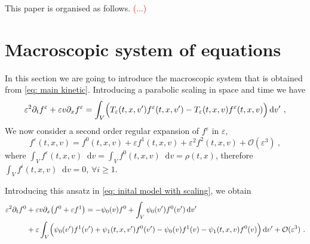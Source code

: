 \documentclass[11pt,twoside]{article}
\newcommand*\diff{\mathop{}\!\mathrm{d}}
\newcommand{\e}{\varepsilon}
\begin{document}
This paper is organised as follows. \textcolor{red}{(...)}


\section{Macroscopic system of equations}
In this section we are going to introduce the macroscopic system that is obtained from \eqref{eq: main kinetic}.
Introducing a parabolic scaling in space and time we have
\begin{equation}
    \varepsilon^2 \partial_t f^\varepsilon+\varepsilon{v}\partial_x f^\varepsilon = \int_V\Bigl(T_\varepsilon(t,x,v')f^\varepsilon(t,x,v')-T_\varepsilon(t,x,v)f^\varepsilon(t,x,v)\Bigr)\diff v'\ , \label{eq: inital model with scaling}
\end{equation}
We now consider a second order regular expansion of $f^\e$ in $\varepsilon$, 
\begin{equation*}
f^\e(t,{x},{v})=f^0(t,{x},{v})+\varepsilon f^1(t,{x},{v})+\varepsilon^2 f^2(t,{x},{v})+\mathcal{O}(\varepsilon^3)\ , 
\end{equation*}
where $\int_V f^\e(t,{x},{v})\diff {v} = \int_V f^0(t,{x},{v})\diff {v} = \rho(t,{x})$, therefore $\int_V f^i(t,{x},{v})\diff {v}=0$, $\forall i\geq 1$.






Introducing this ansatz in \eqref{eq: inital model with scaling}, we obtain
\iffalse
{\begin{align*}
    \varepsilon^2\partial_t f^0&+\varepsilon{v}\partial_x\big(f^0+\varepsilon f^1  \big) 
    =-\psi_0(v) f^0+\int_V\psi_0(v')f^0(v')\diff v'\\
    &+\varepsilon\int_V\Bigl(\psi_0(v')f^1(v')+\psi_1(t,x,v')f^0(v')-\psi_0(v)f^1(v)-\psi_1(t,x,v)f^0(v) \Bigr)\diff v'+{\mathcal{O}(\varepsilon^3)}
      \ .
\end{align*}}
\end{document}
